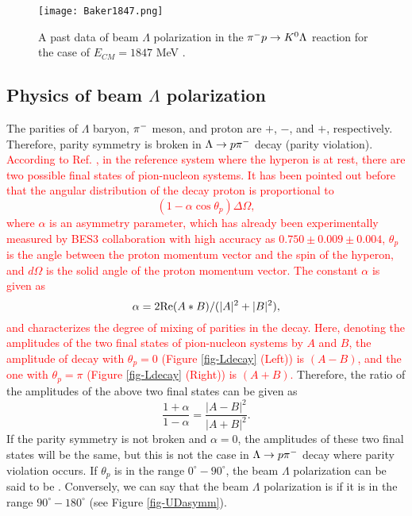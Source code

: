 \begin{figure}[h]
  \centering
  \texttt{[image: Baker1847.png]}
  \caption{A past data of beam $\Lambda$ polarization in the $\pi^- p \to K^0 \Lambda$ reaction for the case of $E_{CM}=1847$ MeV \cite{Baker}.}
  \label{fig-Baker1847}
\end{figure}

\subsection{Physics of beam $\Lambda$ polarization}
\label{sec-Pl-phys}

The parities of $\Lambda$ baryon, $\pi^{-}$ meson, and proton are $+$, $-$, and $+$, respectively. Therefore, parity symmetry is broken in $\Lambda\to p\pi^{-}$ decay (parity violation). \textcolor{red}{ According to Ref. \cite{Lee1957}, in the reference system where the hyperon is at rest, there are two possible final states of pion-nucleon systems. It has been pointed out before \cite{Weldman} that the angular distribution of the decay proton is proportional to 
\begin{equation}
  (1-\alpha\cos{\theta_{p}}) \Delta\Omega,
\end{equation}
where $\alpha$ is an asymmetry parameter, which has already been experimentally measured by BES3 collaboration \cite{Alpha} with high accuracy as $0.750\pm0.009\pm0.004$, $\theta_{p}$ is the angle between the proton momentum vector and the spin of the hyperon, and $d\Omega$ is the solid angle of the proton momentum vector. The constant $\alpha$ is given as 
\begin{equation}
  \alpha = 2 {\rm Re}(A*B) / (|A|^{2} + |B|^{2}),
\end{equation}
and characterizes the degree of mixing of parities in the decay. Here, denoting the amplitudes of the two final states of pion-nucleon systems by $A$ and $B$, the amplitude of decay with $\theta_{p}=0$ (Figure \ref{fig-Ldecay} (Left)) is $(A-B)$, and the one with $\theta_{p}=\pi$ (Figure \ref{fig-Ldecay} (Right)) is $(A+B)$. } Therefore, the ratio of the amplitudes of the above two final states can be given as
\begin{equation}
  \frac{1+\alpha}{1-\alpha} = \frac{|A-B|^{2}}{|A+B|^{2}}.
\end{equation}
If the parity symmetry is not broken and $\alpha=0$, the amplitudes of these two final states will be the same, but this is not the case in $\Lambda\to p\pi^{-}$ decay where parity violation occurs. If $\theta_{p}$ is in the range $0^{\circ}-90^{\circ}$, the beam $\Lambda$ polarization can be said to be . Conversely, we can say that the beam $\Lambda$ polarization is  if it is in the range $90^{\circ}-180^{\circ}$ (see Figure \ref{fig-UDasymm}). 

